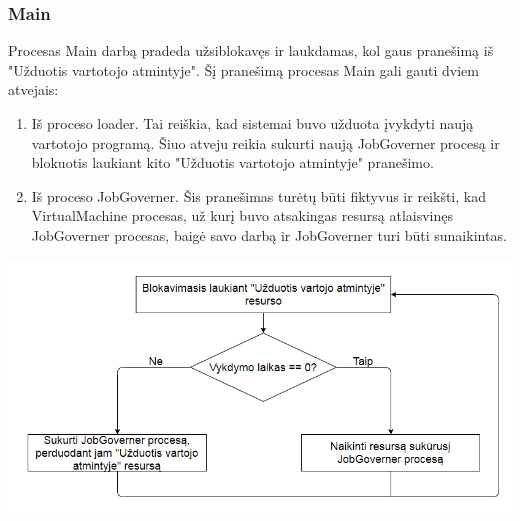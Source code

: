 \documentclass{scrartcl}
\begin{document}
      \subsubsection{Main}
        Procesas Main darbą pradeda užsiblokavęs ir laukdamas, kol gaus pranešimą iš "Užduotis vartotojo atmintyje". Šį pranešimą procesas Main gali gauti dviem atvejais:
        \begin{enumerate}
          \item Iš proceso loader. Tai reiškia, kad sistemai buvo užduota įvykdyti naują vartotojo programą. Šiuo atveju reikia sukurti naują JobGoverner procesą ir blokuotis laukiant kito "Užduotis vartotojo atmintyje" pranešimo.
          \item Iš proceso JobGoverner. Šis pranešimas turėtų būti fiktyvus ir reikšti, kad VirtualMachine procesas, už kurį buvo atsakingas resursą atlaisvinęs JobGoverner procesas, baigė savo darbą ir JobGoverner turi būti sunaikintas.
        \end{enumerate}
        \begin{center}
          \includegraphics[scale=0.65]{Main}
        \end{center}
\end{document}
